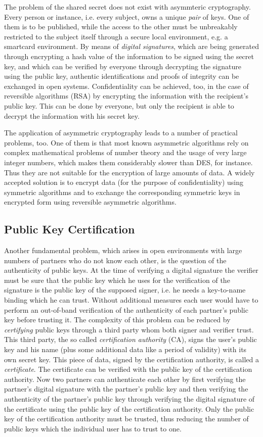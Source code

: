 The problem of the shared secret does not exist with asymmteric cryptography. Every person
or instance, i.e. every subject,  owns a unique {\em pair} of keys. One of them 
is to be published, while the access to the other must be unbreakably restricted to the
subject itself through a secure local environment, e.g. a smartcard environment.
By means of {\em digital signatures}, which are being generated through encrypting
a hash value of the information to be signed using the secret key, and which can be verified by everyone through decrypting the signature using the public key, authentic identifications 
and proofs of integrity can be exchanged in open systems. 
Confidentiality can be achieved, too, in the case of reversible algorithms (RSA) by encrypting 
the information with the recipient's public
key. This can be done by everyone, but only the recipient is able to decrypt
the information with his secret key. 

The application of asymmetric cryptography leads to a number of practical problems, too.
One of them is that most known asymmetric algorithms rely on
complex mathematical problems of number theory and the usage of very large integer numbers,
which makes them considerably slower than DES, for instance. Thus they are not suitable
for the encryption of large amounts of data. A widely accepted solution is to encrypt
data (for the purpose of confidentiality) using symmetric algorithms and to exchange
the corresponding symmetric keys in encrypted form using reversible asymmetric algorithms.

\subsection{Public Key Certification}
Another fundamental problem, which arises in open environments with large numbers of
partners who do not know each other, is the question of the authenticity of public
keys. At the time of verifying a digital signature the verifier must be sure that the 
public key which he uses for the verification of the signature is the public key of 
the supposed signer, i.e. he needs a key-to-name binding which he can trust. 
Without additional measures each user would have to perform an out-of-band verification
of the authenticity of each partner's public key before trusting it. The complexity
of this problem can be reduced by {\em certifying} public keys through a third party whom
both signer and verifier trust.
This third party, the so called {\em certification authority} (CA),
signs the user's public key and his name (plus some additional
data like a period of validity) with its own secret key. This piece of data, signed  
by the certification authority, is called a {\em certificate}. The certificate can be 
verified with the public key of the certification authority. Now two partners can 
authenticate each other by first verifying the partner's digital signature with the 
partner's public key and then verifying the authenticity of the partner's public
key through verifying the digital signature of the certificate using the public key
of the certification authority. Only the public key of the 
certification authority must be trusted, thus reducing the number of public keys 
which the individual user has to trust to one. 

